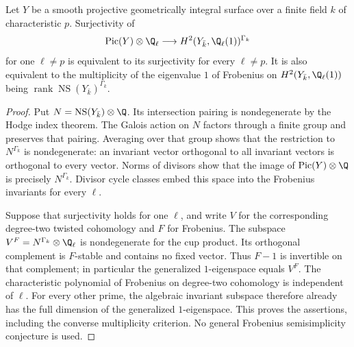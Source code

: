 \begin{lemma}
\label{lem:B-surface-Tate-prime}
Let \(Y\) be a smooth projective geometrically integral surface over a
finite field \(k\) of characteristic \(p\).  Surjectivity of
\[
 \operatorname{Pic}(Y)\otimes\Q_\ell\longrightarrow
 H^2(Y_{\bar k},\Q_\ell(1))^{\Gamma_k}
\]
for one \(\ell\ne p\) is equivalent to its surjectivity for every
\(\ell\ne p\).  It is also equivalent to the multiplicity of the
eigenvalue \(1\) of Frobenius on \(H^2(Y_{\bar k},\Q_\ell(1))\)
being \(\operatorname{rank}\operatorname{NS}(Y_{\bar k})^{\Gamma_k}\).
\end{lemma}

\begin{proof}
Put \(N=\operatorname{NS}(Y_{\bar k})\otimes\Q\).  Its intersection
pairing is nondegenerate by the Hodge index theorem.  The Galois action
on \(N\) factors through a finite group and preserves that pairing.
Averaging over that group shows that the restriction to \(N^{\Gamma_k}\)
is nondegenerate: an invariant vector orthogonal to all invariant
vectors is orthogonal to every vector.  Norms of divisors show that
the image of \(\operatorname{Pic}(Y)\otimes\Q\) is precisely
\(N^{\Gamma_k}\).  Divisor cycle classes embed this space into the
Frobenius invariants for every \(\ell\).

Suppose that surjectivity holds for one \(\ell\), and write \(V\) for
the corresponding degree-two twisted cohomology and \(F\) for
Frobenius.  The subspace \(V^F=N^{\Gamma_k}\otimes\Q_\ell\) is
nondegenerate for the cup product.  Its orthogonal complement is
\(F\)-stable and contains no fixed vector.  Thus \(F-1\) is invertible
on that complement; in particular the generalized \(1\)-eigenspace
equals \(V^F\).  The characteristic polynomial of Frobenius on
degree-two cohomology is independent of \(\ell\).  For every other
prime, the algebraic invariant subspace therefore already has the
full dimension of the generalized \(1\)-eigenspace.  This proves the
assertions, including the converse multiplicity criterion.  No
general Frobenius semisimplicity conjecture is used.
\end{proof}

